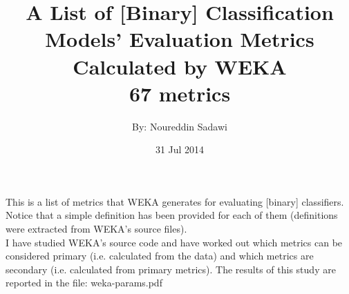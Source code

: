 \documentclass[a4paper,12pt, english]{article}
\begin{document}
\title{
A List of [Binary] Classification Models' Evaluation Metrics\\
Calculated by WEKA\\
\small{67 metrics}
}
\date{31 Jul 2014}
\author{By: Noureddin Sadawi}
\maketitle

\large
This is a list of metrics that WEKA generates for evaluating [binary] classifiers. Notice that a simple definition has been provided for each of them (definitions were extracted from WEKA's source files).\\

I have studied WEKA's source code and have worked out which metrics can be considered primary (i.e. calculated from the data) and which metrics are secondary (i.e. calculated from primary metrics). The results of this study are reported in the file: weka-params.pdf\\
\end{document}
